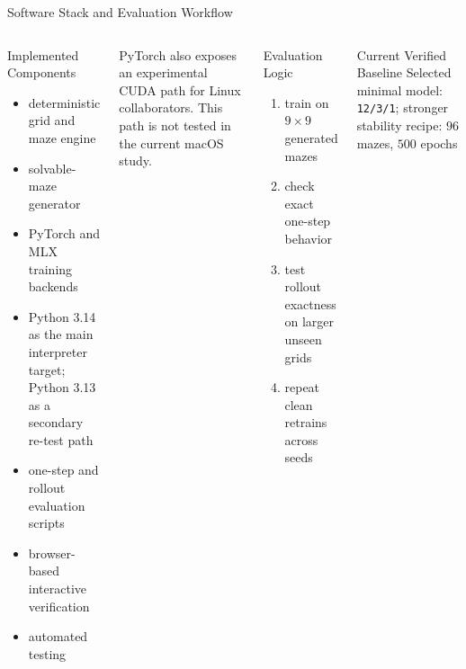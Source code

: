 \documentclass[aspectratio=169,11pt]{beamer}
\begin{document}
\begin{frame}{Software Stack and Evaluation Workflow}
\begin{columns}[T,totalwidth=\textwidth]
\small
\begin{block}{Implemented Components}
\begin{itemize}
  \item deterministic grid and maze engine
  \item solvable-maze generator
  \item PyTorch and MLX training backends
  \item Python 3.14 as the main interpreter target; Python 3.13 as a secondary re-test path
  \item one-step and rollout evaluation scripts
  \item browser-based interactive verification
  \item automated testing
\end{itemize}
\end{block}

\vspace{0.3em}
\scriptsize
PyTorch also exposes an experimental CUDA path for Linux collaborators. This path is not tested in the current macOS study.

\small
\begin{block}{Evaluation Logic}
\begin{enumerate}
  \item train on \(9\times 9\) generated mazes
  \item check exact one-step behavior
  \item test rollout exactness on larger unseen grids
  \item repeat clean retrains across seeds
\end{enumerate}
\end{block}

\vspace{0.4em}
\begin{alertblock}{Current Verified Baseline}
Selected minimal model: \texttt{12/3/1}; stronger stability recipe: \(96\) mazes, \(500\) epochs
\end{alertblock}
\end{columns}
\end{frame}
\end{document}
